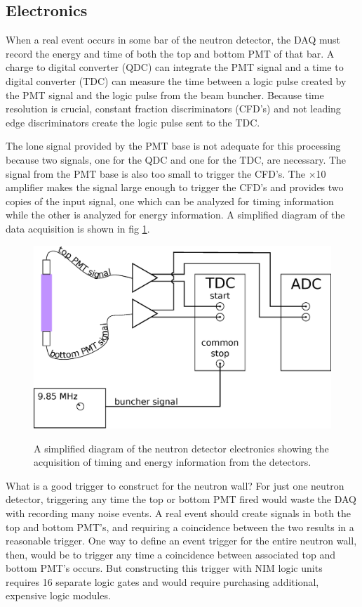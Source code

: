 
\subsection{Electronics}
When a real event occurs in some bar of the neutron detector, the DAQ must record the energy and time of both the top and bottom PMT of that bar.  A charge to digital converter (QDC) can integrate the PMT signal and a time to digital converter (TDC) can measure the time between a logic pulse created by the PMT signal and the logic pulse from the beam buncher.  Because time resolution is crucial, constant fraction discriminators (CFD's) and not leading edge discriminators create the logic pulse sent to the TDC.  

The lone signal provided by the PMT base is not adequate for this processing because two signals, one for the QDC and one for the TDC, are necessary.  The signal from the PMT base is also too small to trigger the CFD's.  The $\times$10 amplifier makes the signal large enough to trigger the CFD's and provides two copies of the input signal, one which can be analyzed for timing information while the other is analyzed for energy information.  A simplified diagram of the data acquisition is shown in fig \ref{fig:simpleElectronics}.

\begin{figure}[htp]
\centering
\includegraphics[width=1.0\textwidth]{figures/basic_electronics.eps}
\label{fig:simpleElectronics}
\caption{A simplified diagram of the neutron detector electronics showing the acquisition of timing and energy information from the detectors.}
\end{figure}

What is a good trigger to construct for the neutron wall?  For just one neutron detector, triggering any time the top or bottom PMT fired would waste the DAQ with recording many noise events.  A real event should create signals in both the top and bottom PMT's, and requiring a coincidence between the two results in a reasonable trigger.  One way to define an event trigger for the entire neutron wall, then, would be to trigger any time a coincidence between associated top and bottom PMT's occurs.  But constructing this trigger with NIM logic units requires 16 separate logic gates and would require purchasing additional, expensive logic modules.  

